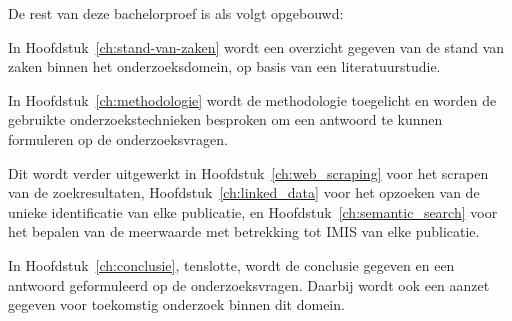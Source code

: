 
De rest van deze bachelorproef is als volgt opgebouwd:

In Hoofdstuk~\ref{ch:stand-van-zaken} wordt een overzicht gegeven van de stand van zaken binnen het onderzoeksdomein, op basis van een literatuurstudie.

In Hoofdstuk~\ref{ch:methodologie} wordt de methodologie toegelicht en worden de gebruikte onderzoekstechnieken besproken om een antwoord te kunnen formuleren op de onderzoeksvragen.

Dit wordt verder uitgewerkt in Hoofdstuk~\ref{ch:web_scraping} voor het scrapen van de zoekresultaten, Hoofdstuk~\ref{ch:linked_data} voor het opzoeken van de unieke identificatie van elke publicatie, en Hoofdstuk~\ref{ch:semantic_search} voor het bepalen van de meerwaarde met betrekking tot IMIS van elke publicatie.


In Hoofdstuk~\ref{ch:conclusie}, tenslotte, wordt de conclusie gegeven en een antwoord geformuleerd op de onderzoeksvragen. Daarbij wordt ook een aanzet gegeven voor toekomstig onderzoek binnen dit domein.